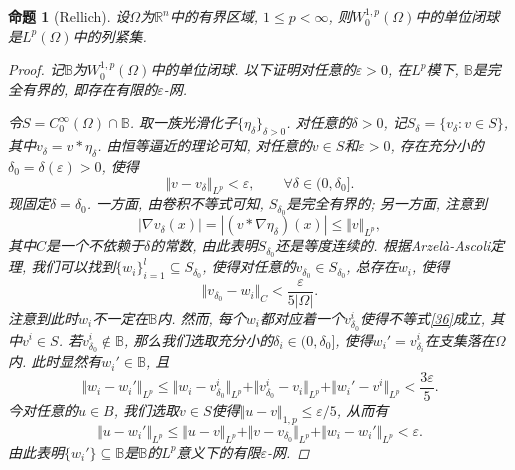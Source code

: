 \documentclass[12pt,a4paper]{article}
\newtheorem{proposition}[theorem]{命题}
\begin{document}
\begin{proposition}[Rellich]
    设$\Omega$为$\mathbb{R}^n$中的有界区域, $1 \leq p < \infty$, 则$W_0^{1, p}(\Omega)$中的单位闭球是$L^p(\Omega)$中的列紧集.
    \begin{proof}
        记$\mathbb{B}$为$W_0^{1, p}(\Omega)$中的单位闭球. 以下证明对任意的$\varepsilon > 0$, 在$L^p$模下, $\mathbb{B}$是完全有界的, 即存在有限的$\varepsilon$-网. 

        令$S = C_0^{\infty}(\Omega) \cap \mathbb{B}$. 取一族光滑化子$\{\eta_{\delta}\}_{\delta > 0}$.
        对任意的$\delta > 0$, 记$S_{\delta} = \{v_{\delta}\colon v \in S\}$, 其中$v_{\delta} = v \ast \eta_{\delta}$.
        由恒等逼近的理论可知, 对任意的$v \in S$和$\varepsilon > 0$, 存在充分小的$\delta_0 = \delta(\varepsilon) > 0$, 使得 
        \begin{equation*}
            \Vert v - v_{\delta} \Vert_{L^p} < \varepsilon, \qquad \forall \delta \in (0, \delta_0].
        \end{equation*}
        现固定$\delta = \delta_0$. 一方面, 由卷积不等式可知, $S_{\delta_0}$是完全有界的; 另一方面, 注意到 
        \begin{equation*}
            |\nabla v_{\delta}(x)| = |(v \ast \nabla\eta_{\delta})(x)| \leq \Vert v \Vert_{L^p},
        \end{equation*}
        其中$C$是一个不依赖于$\delta$的常数, 由此表明$S_{\delta_0}$还是等度连续的. 
        根据Arzelà-Ascoli定理, 我们可以找到$\{w_i\}_{i = 1}^l \subseteq S_{\delta_0}$, 使得对任意的$v_{\delta_0} \in S_{\delta_0}$, 总存在$w_i$, 使得 
        \begin{equation}\label{36}
            \Vert v_{\delta_0} - w_i\Vert_C < \frac{\varepsilon}{5|\Omega|}.
        \end{equation} 
        注意到此时$w_i$不一定在$\mathbb{B}$内. 然而, 每个$w_i$都对应着一个$v_{\delta_0}^i$使得不等式\eqref{36}成立, 其中$v^i \in S$.
        若$v_{\delta_0}^i \notin \mathbb{B}$, 那么我们选取充分小的$\delta_i \in (0, \delta_0]$, 使得$w_i' = v_{\delta_i}^i$在支集落在$\Omega$内.
        此时显然有$w_i' \in \mathbb{B}$, 且 
        \begin{equation*}
            \Vert w_i - w_i'\Vert_{L^p} \leq \Vert w_i - v^i_{\delta_0}\Vert_{L^p} + \Vert v^i_{\delta_0} - v_i\Vert_{L^p} +  \Vert w_i' - v^i\Vert_{L^p} < \frac{3\varepsilon}{5}.
        \end{equation*}
        今对任意的$u \in B$, 我们选取$v \in S$使得$\Vert u - v \Vert_{1, p} \leq \varepsilon/5$, 从而有 
        \begin{equation*}
            \Vert u - w_i'\Vert_{L^p} \leq \Vert u - v \Vert_{L^p} + \Vert v - v_{\delta_0} \Vert_{L^p} + \Vert w_i - w_i'\Vert_{L^p} < \varepsilon.
        \end{equation*}
        由此表明$\{w_i'\} \subseteq \mathbb{B}$是$\mathbb{B}$的$L^p$意义下的有限$\varepsilon$-网.
    \end{proof}
\end{proposition}
\end{document}
